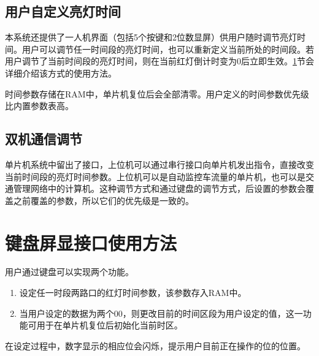 \subsection{用户自定义亮灯时间} 本系统还提供了一人机界面（包括5个按键和2位数显屏）供用户随时调节亮灯时间。用户可以调节任一时间段的亮灯时间，也可以重新定义当前所处的时间段。若用户调节了当前时间段的亮灯时间，则在当前红灯倒计时变为0后立即生效。\ref{sec:functionkeyboard}节会详细介绍该方式的使用方法。

时间参数存储在RAM中，单片机复位后会全部清零。用户定义的时间参数优先级比内置参数表高。
\subsection{双机通信调节} 单片机系统中留出了接口，上位机可以通过串行接口向单片机发出指令，直接改变当前时间段的亮灯时间参数。上位机可以是自动监控车流量的单片机，也可以是交通管理网络中的计算机。这种调节方式和通过键盘的调节方式，后设置的参数会覆盖之前覆盖的参数，所以它们的优先级是一致的。

\section{键盘屏显接口使用方法} \label{sec:functionkeyboard}
用户通过键盘可以实现两个功能。
\begin{enumerate}
\item 设定任一时段两路口的红灯时间参数，该参数存入RAM中。
\item 当用户设定的数据为两个00，则更改目前的时间区段为用户设定的值，这一功能可用于在单片机复位后初始化当前时区。
\end{enumerate}

在设定过程中，数字显示的相应位会闪烁，提示用户目前正在操作的位的位置。
